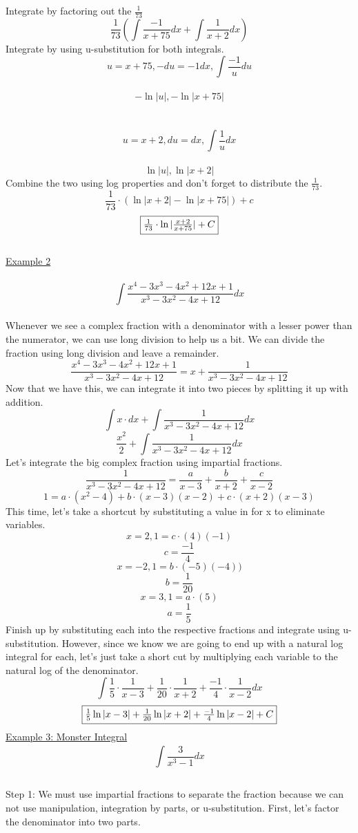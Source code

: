 \documentclass[a4paper,openright, 10pt]{article}
\begin{document}
 Integrate by factoring out the $\frac{1}{73}$\\
 $$\frac{1}{73}(\int\frac{-1}{x+75}dx+\int\frac{1}{x+2}dx)$$
 Integrate by using u-substitution for both integrals.\\
$$u=x+75,-du=-1dx,\int\frac{-1}{u}du$$\\
$$-\ln|u|,-\ln|x+75|$$\\\\
$$u=x+2,du=dx,\int\frac{1}{u}dx$$\\
$$\ln|u|,\ln|x+2|$$
Combine the two using log properties and don't forget to distribute the $\frac{1}{73}$.
 $$\frac{1}{73}\cdot(\ln|x+2|-\ln|x+75|)+c$$
 $$\fbox{$\frac{1}{73}\cdot\ln|\frac{x+2}{x+75}|+C$}$$\\
 \underline{Example 2}\\\\
 $$\int\frac{x^4-3x^3-4x^2+12x+1}{x^3-3x^2-4x+12}dx$$\\
 Whenever we see a complex fraction with a denominator with a lesser power than the numerator, we can use long division to help us a bit. We can divide the fraction using long division and leave a remainder.\\
 $$\frac{x^4-3x^3-4x^2+12x+1}{x^3-3x^2-4x+12}=x+\frac{1}{x^3-3x^2-4x+12}$$
 Now that we have this, we can integrate it into two pieces by splitting it up with addition.\\
 $$\int x\cdot dx + \int\frac{1}{x^3-3x^2-4x+12}dx$$
 $$\frac{x^2}{2}+\int\frac{1}{x^3-3x^2-4x+12}dx$$
Let's integrate the big complex fraction using impartial fractions.
$$\frac{1}{x^3-3x^2-4x+12}=\frac{a}{x-3}+\frac{b}{x+2}+\frac{c}{x-2}$$
$${1}=a\cdot(x^2-4)+b\cdot(x-3)(x-2)+c\cdot(x+2)(x-3)$$
This time, let's take a shortcut by substituting a value in for x to eliminate variables.
$$x=2, 1=c\cdot(4)(-1)$$
$$c=\frac{-1}{4}$$
$$x=-2,1=b\cdot(-5)(-4))$$
$$b=\frac{1}{20}$$
$$x=3, 1=a\cdot(5)$$
$$a=\frac{1}{5}$$
Finish up by substituting each into the respective fractions and integrate using u-substitution. However, since we know we are going to end up with a natural log integral for each, let's just take a short cut by multiplying each variable to the natural log of the denominator.
$$\int\frac{1}{5}\cdot\frac{1}{x-3}+\frac{1}{20}\cdot\frac{1}{x+2}+\frac{-1}{4}\cdot\frac{1}{x-2}dx$$
$$\fbox{$\frac{1}{5}\ln|x-3|+\frac{1}{20}\ln|x+2|+\frac{-1}{4}\ln|x-2|+C$}$$
\underline{Example 3: Monster Integral}
$$\int\limits_{}^{}\frac{3}{x^{3}-1}dx $$\\
Step 1: We must use impartial fractions to separate the fraction because we can not use manipulation, integration by parts, or u-substitution. First, let's factor the denominator into two parts.\\\\
\end{document}
